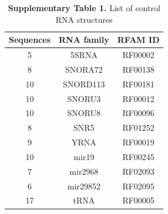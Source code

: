\documentclass[a4paper,11pt]{article}
\begin{document}
\begin{table}
\centering
\caption{\textbf{Supplementary Table 1.}  List of control RNA structures }
\begin{tabular}{ccc}
\hline
Sequences & RNA family & RFAM ID \\
\hline
   5 & 5SRNA & RF00002 \\
   8 & SNORA72 & RF00138 \\
  10 & SNORD113 & RF00181\\
  10 & SNORU3 & RF00012\\
  10 & SNORU8 & RF00096\\
   8 & SNR5 & RF01252\\
   9 & YRNA & RF00019\\
  10 & mir19 & RF00245\\
   7 & mir2968 & RF02093\\
   6 & mir29852 & RF02095\\
  17 & tRNA & RF00005\\
\hline
\end{tabular}
\end{table}
\end{document}
